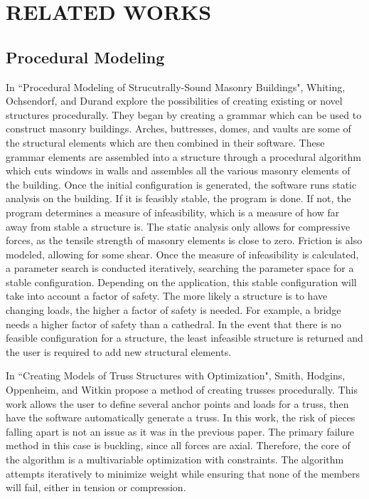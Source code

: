\documentclass{thesis}
\begin{document}
\clearpage
\chapter{RELATED WORKS}
\section{Procedural Modeling}
In ``Procedural Modeling of Strucutrally-Sound Masonry Buildings"\cite{whiting:2009}, Whiting, Ochsendorf, and Durand explore
the possibilities of creating existing or novel structures procedurally.  They began by creating a grammar
which can be used to construct masonry buildings.  Arches, buttresses, domes, and vaults are some of the
structural elements which are then combined in their software.  These grammar elements are assembled into
a structure through a procedural algorithm which cuts windows in walls and assembles
all the various masonry elements of the building.  Once the initial configuration is
generated, the software runs static analysis on the building.  If it is feasibly stable, the program is
done.  If not, the program determines a measure of infeasibility, which is a measure of how far away from
stable a structure is.  The static analysis only allows for compressive forces, as the tensile strength of
masonry elements is close to zero.  Friction is also modeled, allowing for some shear.  Once the measure
of infeasibility is calculated, a parameter search is conducted iteratively, searching the parameter space
for a stable configuration.  Depending on the application, this stable configuration will take into account
a factor of safety.  The more likely a structure is to have changing loads, the higher a factor of
safety is needed.  For example, a bridge needs a higher factor of safety than a cathedral.  In the event
that there is no feasible configuration for a structure, the least infeasible structure is returned and the
user is required to add new structural elements.

In ``Creating Models of Truss Structures with Optimization"\cite{Carnegie02creatingmodels}, Smith, Hodgins, Oppenheim, and Witkin propose
a method of creating trusses procedurally.  This work allows the user to define several anchor points
and loads for a truss, then have the software automatically generate a truss.  In this work, the risk
of pieces falling apart is not an issue as it was in the previous paper.  The primary failure method
in this case is buckling, since all forces are axial.  Therefore, the core of the algorithm is a
multivariable optimization with constraints.  The algorithm attempts iteratively to minimize weight
while ensuring that none of the members will fail, either in tension or compression.
\end{document}
